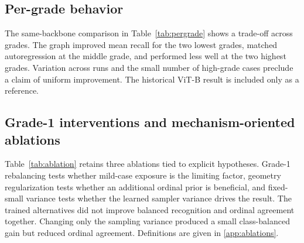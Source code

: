\documentclass[a4paper,fleqn]{cas-sc}
\begin{document}
\subsection{Per-grade behavior}

The same-backbone comparison in Table~\ref{tab:pergrade} shows a trade-off across grades. The graph improved mean recall for the two lowest grades, matched autoregression at the middle grade, and performed less well at the two highest grades. Variation across runs and the small number of high-grade cases preclude a claim of uniform improvement. The historical ViT-B result is included only as a reference.

\begin{table}
\centering
\caption{Recall for each MESSIDOR grade. RETFound autoregression (AR) and directed-graph values are mean $\pm$ sample standard deviation over three runs, computed from the unrounded confusion-matrix counts. The ViT-B reference is a single historical run.}
\label{tab:pergrade}
\small

\end{table}

\subsection{Grade-1 interventions and mechanism-oriented ablations}

Table~\ref{tab:ablation} retains three ablations tied to explicit hypotheses. Grade-1 rebalancing tests whether mild-case exposure is the limiting factor, geometry regularization tests whether an additional ordinal prior is beneficial, and fixed-small variance tests whether the learned sampler variance drives the result. The trained alternatives did not improve balanced recognition and ordinal agreement together. Changing only the sampling variance produced a small class-balanced gain but reduced ordinal agreement. Definitions are given in \ref{app:ablations}.

\begin{table}
\centering
\caption{Hypothesis-driven ablations relative to one directed-graph run. Rebalancing and geometry are separately trained variants. Fixed-small variance changes only inference for the reference checkpoint.}
\label{tab:ablation}
\small
{}
\end{table}
\end{document}
